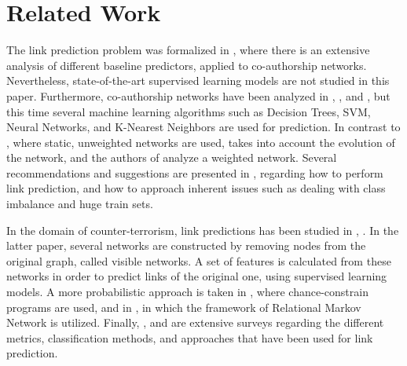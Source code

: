 \documentclass{acm_proc_article-sp}
\begin{document}

\section{Related Work}

The link prediction problem was formalized in \cite{Liben-Nowell:2003:LPP:956863.956972}, where there is an extensive analysis of different baseline predictors, applied to co-authorship networks. Nevertheless, state-of-the-art supervised learning models are not studied in this paper. Furthermore, co-authorship networks have been analyzed in \cite{Hasan06linkprediction}, \cite{Pavlov:2007:FEL:2889513.2889517}, and \cite{de2011supervised}, but this time several machine learning algorithms such as Decision Trees, SVM, Neural Networks, and K-Nearest Neighbors are used for prediction. In contrast to \cite{Hasan06linkprediction}, where static, unweighted networks are used, \cite{Pavlov:2007:FEL:2889513.2889517} takes into account the evolution of the network, and the authors of \cite{de2011supervised} analyze a weighted network. Several recommendations and suggestions are presented in \cite{Lichtenwalter:2010:NPM:1835804.1835837}, regarding how to perform link prediction, and how to approach inherent issues such as dealing with class imbalance and huge train sets. 

In the domain of counter-terrorism, link predictions has been studied in \cite{dombroski2003estimating}, \cite{Fire2013}. In the latter paper, several networks are constructed by removing nodes from the original graph, called visible networks. A set of features is calculated from these networks in order to predict links of the original one, using supervised learning models. A more probabilistic approach is taken in \cite{doppa:nips09-wkshp}, where chance-constrain programs are used, and in \cite{NIPS2003_2465}, in which the framework of Relational Markov Network is utilized. Finally, \cite{DBLP:journals/corr/WangXWZ14}, and \cite{Hasan2011} are extensive surveys regarding the different metrics, classification methods, and approaches that have been used for link prediction. 
\end{document}
